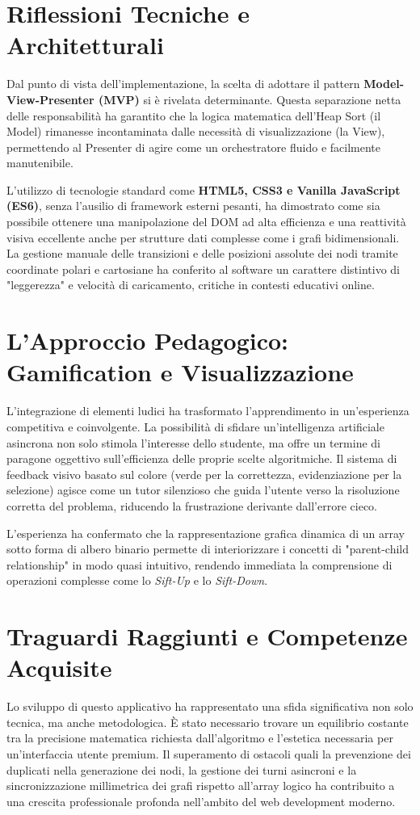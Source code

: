 \documentclass[openany]{theme/uniprthesis}
\begin{document}
\section*{Riflessioni Tecniche e Architetturali}
Dal punto di vista dell'implementazione, la scelta di adottare il pattern \textbf{Model-View-Presenter (MVP)} si è rivelata determinante. Questa separazione netta delle responsabilità ha garantito che la logica matematica dell'Heap Sort (il Model) rimanesse incontaminata dalle necessità di visualizzazione (la View), permettendo al Presenter di agire come un orchestratore fluido e facilmente manutenibile.

L'utilizzo di tecnologie standard come \textbf{HTML5, CSS3 e Vanilla JavaScript (ES6)}, senza l'ausilio di framework esterni pesanti, ha dimostrato come sia possibile ottenere una manipolazione del DOM ad alta efficienza e una reattività visiva eccellente anche per strutture dati complesse come i grafi bidimensionali. La gestione manuale delle transizioni e delle posizioni assolute dei nodi tramite coordinate polari e cartosiane ha conferito al software un carattere distintivo di "leggerezza" e velocità di caricamento, critiche in contesti educativi online.

\section*{L'Approccio Pedagogico: Gamification e Visualizzazione}
L'integrazione di elementi ludici ha trasformato l'apprendimento in un'esperienza competitiva e coinvolgente. La possibilità di sfidare un'intelligenza artificiale asincrona non solo stimola l'interesse dello studente, ma offre un termine di paragone oggettivo sull'efficienza delle proprie scelte algoritmiche. Il sistema di feedback visivo basato sul colore (verde per la correttezza, evidenziazione per la selezione) agisce come un tutor silenzioso che guida l'utente verso la risoluzione corretta del problema, riducendo la frustrazione derivante dall'errore cieco.

L'esperienza ha confermato che la rappresentazione grafica dinamica di un array sotto forma di albero binario permette di interiorizzare i concetti di "parent-child relationship" in modo quasi intuitivo, rendendo immediata la comprensione di operazioni complesse come lo \textit{Sift-Up} e lo \textit{Sift-Down}.

\section*{Traguardi Raggiunti e Competenze Acquisite}
Lo sviluppo di questo applicativo ha rappresentato una sfida significativa non solo tecnica, ma anche metodologica. È stato necessario trovare un equilibrio costante tra la precisione matematica richiesta dall'algoritmo e l'estetica necessaria per un'interfaccia utente premium. Il superamento di ostacoli quali la prevenzione dei duplicati nella generazione dei nodi, la gestione dei turni asincroni e la sincronizzazione millimetrica dei grafi rispetto all'array logico ha contribuito a una crescita professionale profonda nell'ambito del web development moderno.
\end{document}
